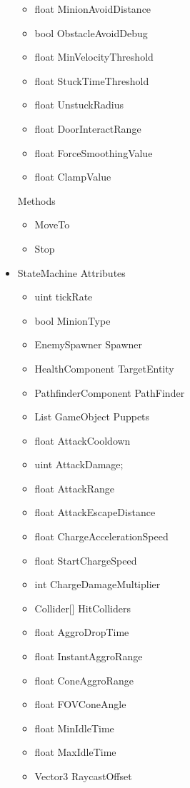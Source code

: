 \documentclass[11pt]{article}
\begin{document}
\begin{itemize}
\begin{itemize}
		\item float MinionAvoidDistance
		\item bool ObstacleAvoidDebug
		\newline
		\item float MinVelocityThreshold
		\item float StuckTimeThreshold
		\item float UnstuckRadius
		\newline
		\item float DoorInteractRange
		\item float ForceSmoothingValue
		\item float ClampValue
		
	\end{itemize}
	Methods
	\begin{itemize}
		\item MoveTo
		\item Stop
	\end{itemize}
\newpage
	\item StateMachine
	\newline Attributes
	\begin{itemize}
		\item uint tickRate
		\item bool MinionType
		\item EnemySpawner Spawner
		\item HealthComponent TargetEntity
		\item PathfinderComponent PathFinder
		\item List GameObject Puppets
		\item float AttackCooldown
		\item uint AttackDamage;
		\item float AttackRange
		\item float AttackEscapeDistance
		\item float ChargeAccelerationSpeed
		\item float StartChargeSpeed
		\item int ChargeDamageMultiplier
		\item Collider[] HitColliders
		\item float AggroDropTime
		\item float InstantAggroRange
		\item float ConeAggroRange
		\item float FOVConeAngle
		\item float MinIdleTime
		\item float MaxIdleTime
		\item Vector3 RaycastOffset

\end{itemize}
\end{itemize}
\end{document}
